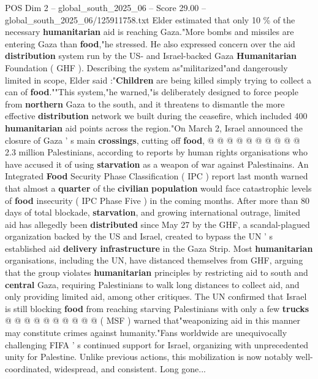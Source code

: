 \begin{textsample}{POS Dim 2 – global\_south\_2025\_06 – Score 29.00 – global\_south\_2025\_06/125911758.txt}
Elder estimated that only 10 \% of the necessary \textbf{humanitarian} aid is reaching Gaza."More bombs and missiles are entering Gaza than \textbf{food},"he stressed.
He also expressed concern over the aid \textbf{distribution} system run by the US- and Israel-backed Gaza \textbf{Humanitarian} Foundation ( GHF ).
Describing the system as"militarized"and dangerously limited in scope, Elder said :"\textbf{Children} are being killed simply trying to collect a can of \textbf{food}.""This system,"he warned,"is deliberately designed to force people from \textbf{northern} Gaza to the south, and it threatens to dismantle the more effective \textbf{distribution} network we built during the ceasefire, which included 400 \textbf{humanitarian} aid points across the region."On March 2, Israel announced the closure of Gaza ' s main \textbf{crossings}, cutting off \textbf{food}, @ @ @ @ @ @ @ @ @ @ 2.3 million Palestinians, according to reports by human rights organisations who have accused it of using \textbf{starvation} as a weapon of war against Palestinains.
An Integrated \textbf{Food} Security Phase Classification ( IPC ) report last month warned that almost a \textbf{quarter} of the \textbf{civilian} \textbf{population} would face catastrophic levels of \textbf{food} insecurity ( IPC Phase Five ) in the coming months.
After more than 80 days of total blockade, \textbf{starvation}, and growing international outrage, limited aid has allegedly been \textbf{distributed} since May 27 by the GHF, a scandal-plagued organization backed by the US and Israel, created to bypass the UN ' s established aid \textbf{delivery} \textbf{infrastructure} in the Gaza Strip.
Most \textbf{humanitarian} organisations, including the UN, have distanced themselves from GHF, arguing that the group violates \textbf{humanitarian} principles by restricting aid to south and \textbf{central} Gaza, requiring Palestinians to walk long distances to collect aid, and only providing limited aid, among other critiques.
The UN confirmed that Israel is still blocking \textbf{food} from reaching starving Palestinians with only a few \textbf{trucks} @ @ @ @ @ @ @ @ @ @ ( MSF ) warned that"weaponizing aid in this manner may constitute crimes against humanity."Fans worldwide are unequivocally challenging FIFA ' s continued support for Israel, organizing with unprecedented unity for Palestine.
Unlike previous actions, this mobilization is now notably well-coordinated, widespread, and consistent.
Long gone...

\end{textsample}
